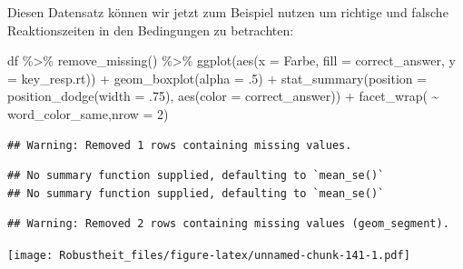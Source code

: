 \documentclass[
]{book}
\newenvironment{Shaded}{\begin{snugshade}}{\end{snugshade}}
\newcommand{\AttributeTok}[1]{\textcolor[rgb]{0.77,0.63,0.00}{#1}}
\newcommand{\DecValTok}[1]{\textcolor[rgb]{0.00,0.00,0.81}{#1}}
\newcommand{\FunctionTok}[1]{\textcolor[rgb]{0.00,0.00,0.00}{#1}}
\newcommand{\NormalTok}[1]{#1}
\newcommand{\SpecialCharTok}[1]{\textcolor[rgb]{0.00,0.00,0.00}{#1}}
\begin{document}
Diesen Datensatz können wir jetzt zum Beispiel nutzen um richtige und falsche Reaktionszeiten in den Bedingungen zu betrachten:

\begin{Shaded}
\begin{Highlighting}[]
\NormalTok{df }\SpecialCharTok{\%\textgreater{}\%} 
  \FunctionTok{remove\_missing}\NormalTok{() }\SpecialCharTok{\%\textgreater{}\%} 
  \FunctionTok{ggplot}\NormalTok{(}\FunctionTok{aes}\NormalTok{(}\AttributeTok{x =}\NormalTok{ Farbe,}
             \AttributeTok{fill =}\NormalTok{ correct\_answer,}
             \AttributeTok{y =}\NormalTok{ key\_resp.rt)) }\SpecialCharTok{+}
  \FunctionTok{geom\_boxplot}\NormalTok{(}\AttributeTok{alpha =}\NormalTok{ .}\DecValTok{5}\NormalTok{) }\SpecialCharTok{+}
  \FunctionTok{stat\_summary}\NormalTok{(}\AttributeTok{position =} \FunctionTok{position\_dodge}\NormalTok{(}\AttributeTok{width =}\NormalTok{ .}\DecValTok{75}\NormalTok{),}
               \FunctionTok{aes}\NormalTok{(}\AttributeTok{color =}\NormalTok{ correct\_answer)) }\SpecialCharTok{+}
  \FunctionTok{facet\_wrap}\NormalTok{( }\SpecialCharTok{\textasciitilde{}}\NormalTok{ word\_color\_same,}\AttributeTok{nrow =} \DecValTok{2}\NormalTok{)}
\end{Highlighting}
\end{Shaded}

\begin{verbatim}
## Warning: Removed 1 rows containing missing values.
\end{verbatim}

\begin{verbatim}
## No summary function supplied, defaulting to `mean_se()`
## No summary function supplied, defaulting to `mean_se()`
\end{verbatim}

\begin{verbatim}
## Warning: Removed 2 rows containing missing values (geom_segment).
\end{verbatim}

\texttt{[image: Robustheit\_files/figure-latex/unnamed-chunk-141-1.pdf]}

  
\end{document}
